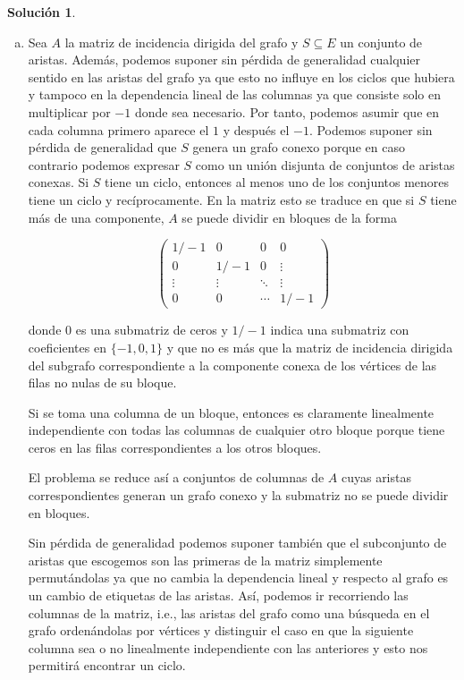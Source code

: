 \documentclass[10pt]{article}
\theoremstyle{definition}
\newtheorem*{sol}{Solución}
\begin{document}
\begin{sol}\item[]
\begin{enumerate}[(a)]
\item Sea $A$ la matriz de incidencia dirigida del grafo y $S\subseteq E$ un conjunto de aristas. Además, podemos suponer sin pérdida de generalidad cualquier sentido en las aristas del grafo ya que esto no influye en los ciclos que hubiera y tampoco en la dependencia lineal de las columnas ya que consiste solo en multiplicar por $-1$ donde sea necesario. Por tanto, podemos asumir que en cada columna primero aparece el $1$ y después el $-1$. Podemos suponer sin pérdida de generalidad que $S$ genera un grafo conexo porque en caso contrario podemos expresar $S$ como un unión disjunta de conjuntos de aristas conexas. Si $S$ tiene un ciclo, entonces al menos uno de los conjuntos menores tiene un ciclo y recíprocamente. En la matriz esto se traduce en que si $S$ tiene más de una componente, $A$ se puede dividir en bloques de la forma

$$\begin{pmatrix}
1/-1 & 0 & 0 & 0\\
0 & 1/-1 & 0 & \vdots \\
\vdots & \vdots & \ddots & \vdots\\
0 & 0 &  \cdots & 1/-1
\end{pmatrix}$$

donde $0$ es una submatriz de ceros y $1/-1$ indica una submatriz con coeficientes en $\{-1,0,1\}$ y que no es más que la matriz de incidencia dirigida del subgrafo correspondiente a la componente conexa de los vértices de las filas no nulas de su bloque.

Si se toma una columna de un bloque, entonces es claramente linealmente independiente con todas las columnas de cualquier otro bloque porque tiene ceros en las filas correspondientes a los otros bloques.

El problema se reduce así a conjuntos de columnas de $A$ cuyas aristas correspondientes generan un grafo conexo y la submatriz no se puede dividir en bloques. 

Sin pérdida de generalidad podemos suponer también que el subconjunto de aristas que escogemos son las primeras de la matriz simplemente permutándolas ya que no cambia la dependencia lineal y respecto al grafo es un cambio de etiquetas de las aristas. Así, podemos ir recorriendo las columnas de la matriz, i.e., las aristas del grafo como una búsqueda en el grafo ordenándolas por vértices y distinguir el caso en que la siguiente columna sea o no linealmente independiente con las anteriores y esto nos permitirá encontrar un ciclo.


\end{enumerate}
\end{sol}
\end{document}
